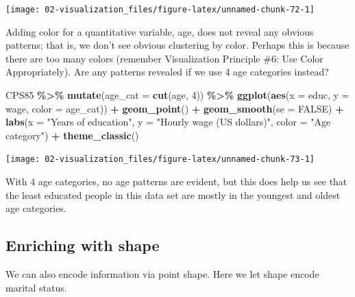 \documentclass[
]{book}
\newenvironment{Shaded}{\begin{snugshade}}{\end{snugshade}}
\newcommand{\AttributeTok}[1]{\textcolor[rgb]{0.13,0.29,0.53}{#1}}
\newcommand{\ConstantTok}[1]{\textcolor[rgb]{0.56,0.35,0.01}{#1}}
\newcommand{\DecValTok}[1]{\textcolor[rgb]{0.00,0.00,0.81}{#1}}
\newcommand{\FunctionTok}[1]{\textcolor[rgb]{0.13,0.29,0.53}{\textbf{#1}}}
\newcommand{\NormalTok}[1]{#1}
\newcommand{\SpecialCharTok}[1]{\textcolor[rgb]{0.81,0.36,0.00}{\textbf{#1}}}
\newcommand{\StringTok}[1]{\textcolor[rgb]{0.31,0.60,0.02}{#1}}
\begin{document}
\begin{center}\texttt{[image: 02-visualization\_files/figure-latex/unnamed-chunk-72-1]} \end{center}

Adding color for a quantitative variable, age, does not reveal any obvious patterns; that is, we don't see obvious clustering by color. Perhaps this is because there are too many colors (remember Visualization Principle \#6: Use Color Appropriately). Are any patterns revealed if we use 4 age categories instead?

\begin{Shaded}
\begin{Highlighting}[]
\NormalTok{CPS85 }\SpecialCharTok{\%\textgreater{}\%}
    \FunctionTok{mutate}\NormalTok{(}\AttributeTok{age\_cat =} \FunctionTok{cut}\NormalTok{(age, }\DecValTok{4}\NormalTok{)) }\SpecialCharTok{\%\textgreater{}\%}
    \FunctionTok{ggplot}\NormalTok{(}\FunctionTok{aes}\NormalTok{(}\AttributeTok{x =}\NormalTok{ educ, }\AttributeTok{y =}\NormalTok{ wage, }\AttributeTok{color =}\NormalTok{ age\_cat)) }\SpecialCharTok{+}
    \FunctionTok{geom\_point}\NormalTok{() }\SpecialCharTok{+}
    \FunctionTok{geom\_smooth}\NormalTok{(}\AttributeTok{se =} \ConstantTok{FALSE}\NormalTok{) }\SpecialCharTok{+} 
    \FunctionTok{labs}\NormalTok{(}\AttributeTok{x =} \StringTok{"Years of education"}\NormalTok{, }\AttributeTok{y =} \StringTok{"Hourly wage (US dollars)"}\NormalTok{, }\AttributeTok{color =} \StringTok{"Age category"}\NormalTok{) }\SpecialCharTok{+}
    \FunctionTok{theme\_classic}\NormalTok{()}
\end{Highlighting}
\end{Shaded}

\begin{center}\texttt{[image: 02-visualization\_files/figure-latex/unnamed-chunk-73-1]} \end{center}

With 4 age categories, no age patterns are evident, but this does help us see that the least educated people in this data set are mostly in the youngest and oldest age categories.

\subsection{Enriching with shape}\label{enriching-with-shape}

We can also encode information via point shape. Here we let shape encode marital status.
\end{document}
